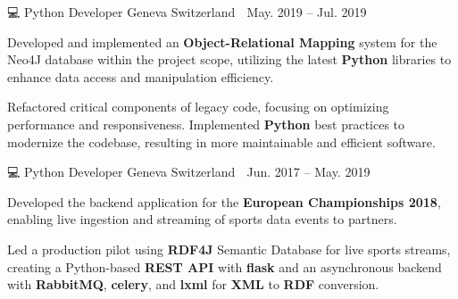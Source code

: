 {\begin{cventries}

        {💻 Python Developer} %
        {Geneva Switzerland 📍} %
        {May. 2019 – Jul. 2019 📆} %
        {\begin{cvitems}
                \item {Developed and implemented an \textbf{Object-Relational Mapping} system for the Neo4J database within the project scope, utilizing the latest \textbf{Python} libraries to enhance data access and manipulation efficiency.}
                \item {Refactored critical components of legacy code, focusing on optimizing performance and responsiveness. Implemented \textbf{Python} best practices to modernize the codebase, resulting in more maintainable and efficient software.}
                \\
                \newline
            \end{cvitems}
        }


        {💻 Python Developer} %
        {Geneva Switzerland 📍} %
        {Jun. 2017 – May. 2019 📆} %
        {\begin{cvitems}
                \item {Developed the backend application for the \textbf{European Championships 2018}, enabling live ingestion and streaming of sports data events to partners.}
                \item {Led a production pilot using \textbf{RDF4J} Semantic Database for live sports streams, creating a Python-based \textbf{REST API} with \textbf{flask} and an asynchronous backend with \textbf{RabbitMQ}, \textbf{celery}, and \textbf{lxml} for \textbf{XML} to \textbf{RDF} conversion.}
                \\
                \newline
            \end{cvitems}
        }


\end{cventries}}
